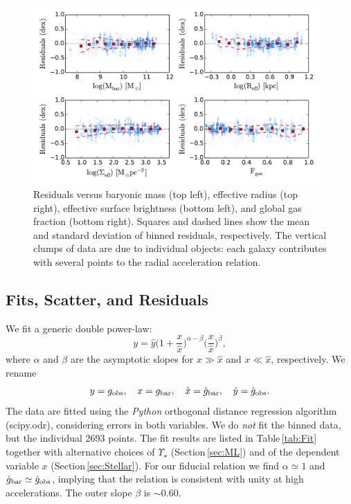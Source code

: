 \documentclass[apjl, twocolappendix]{emulateapj}
\begin{document}
\begin{figure}[thb]
\centering
\includegraphics[width=0.975\textwidth]{RAR_ResGlob.pdf}
\caption{Residuals versus baryonic mass (top left), effective radius (top right), effective surface brightness (bottom left), and global gas fraction (bottom right). Squares and dashed lines show the mean and standard deviation of binned residuals, respectively. The vertical clumps of data are due to individual objects: each galaxy contributes with several points to the radial acceleration relation.}
\label{fig:RARres2}
\end{figure}
\subsection{Fits, Scatter, and Residuals}\label{sec:DiskFit}

We fit a generic double power-law:
\begin{equation}\label{Eq:DoublePower}
 y = \hat{y} \bigg( 1 + \dfrac{x}{\hat{x}}\bigg)^{\alpha-\beta} \bigg(\dfrac{x}{\hat{x}}\bigg)^{\beta},
\end{equation}
where $\alpha$ and $\beta$ are the asymptotic slopes for $x \gg \hat{x}$ and $x \ll \hat{x}$, respectively. We rename
\begin{equation}
 y = g_{\rm obs}, \quad x = g_{\rm bar}, \quad \hat{x} = \hat{g}_{\rm bar}, \quad \hat{y} = \hat{g}_{\rm obs}.
\end{equation}
The data are fitted using the \emph{Python} orthogonal distance regression algorithm (scipy.odr), considering errors in both variables. We do \textit{not} fit the binned data, but the individual 2693 points. The fit results are listed in Table\,\ref{tab:Fit} together with alternative choices of $\Upsilon_{\star}$ (Section\,\ref{sec:ML}) and of the dependent variable $x$ (Section\,\ref{sec:Stellar}). For our fiducial relation we find $\alpha \simeq 1$ and $\hat{g}_{\rm bar} \simeq \hat{g}_{\rm obs}$, implying that the relation is consistent with unity at high accelerations. The outer slope $\beta$ is $\sim$0.60. 
\end{document}
